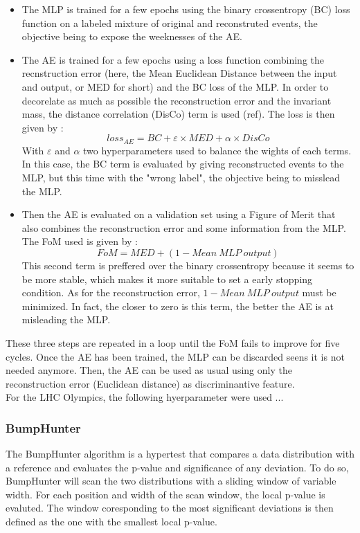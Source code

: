 \documentclass[letterpaper,11pt]{article}
\begin{document}
\begin{itemize}
	\item The MLP is trained for a few epochs using the binary crossentropy (BC) loss function on a labeled mixture of original and reconstruted events, the objective being to expose the weeknesses of the AE.
	
	\item The AE is trained for a few epochs using a loss function combining the recnstruction error (here, the Mean Euclidean Distance between the input and output, or MED for short) and the BC loss of the MLP.
	In order to decorelate as much as possible the reconstruction error and the invariant mass, the distance correlation (DisCo) term is used (ref).
	The loss is then given by :
	$$loss_{AE} = BC+\varepsilon\times MED+\alpha\times DisCo$$
	\noindent With $\varepsilon$ and $\alpha$ two hyperparameters used to balance the wights of each terms. In this case, the BC term is evaluated by giving reconstructed events to the MLP, but this time with the "wrong label", the objective being to misslead the MLP. 
	
	\item Then the AE is evaluated on a validation set using a Figure of Merit that also combines the reconstruction error and some information from the MLP.
	The FoM used is given by :
	$$FoM = MED+(1-Mean~MLP~output)$$
	\noindent This second term is preffered over the binary crossentropy because it seems to be more stable, which makes it more suitable to set a early stopping condition.
	As for the reconstruction error, $1-Mean~MLP~output$ must be minimized.
	In fact, the closer to zero is this term, the better the AE is at misleading the MLP.
\end{itemize}

\noindent These three steps are repeated in a loop until the FoM fails to improve for five cycles. Once the AE has been trained, the MLP can be discarded seens it is not needed anymore. Then, the AE can be used as usual using only the reconstruction error (Euclidean distance) as discriminantive feature.\\

\noindent For the LHC Olympics, the following hyerparameter were used ...

\subsubsection{BumpHunter}
\label{sec:BH}

\noindent The BumpHunter algorithm is a hypertest that compares a data distribution with a reference and evaluates the p-value and significance of any deviation.
To do so, BumpHunter will scan the two distributions with a sliding window of variable width.
For each position and width of the scan window, the local p-value is evaluted. The window coresponding to the most significant deviations is then defined as the one with the smallest local p-value.\\
\end{document}

